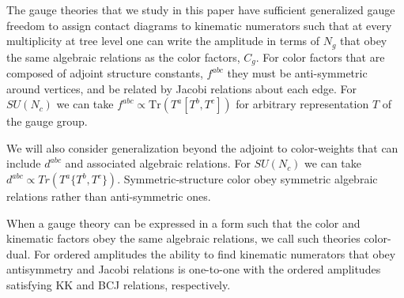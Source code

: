 \documentclass[11pt,letter]{article}
\newcommand{\threeTree}[3]{ {
\begin{tikzpicture}[baseline=7]
\begin{feynman}
\vertex (a1) at (-1.4,0){$i$} ;
\vertex (a2) at (-.4,1){#1} ;
\vertex (a3) at (.4,1){#2} ;
\vertex (a4) at (1.4,0){#3};
\vertex (mid1) at (-.4,0);
\vertex (mid2) at (.4, -0) ;
\diagram{
(mid1) --[ultra thick,](a1),
(mid1) --[ultra thick,](a2),
(mid1) --[ultra thick,](mid2),
(mid2) --[ultra thick,](a3),
(mid2) --[ultra thick,](a4),
};
\end{feynman}
\end{tikzpicture}
}
}
\begin{document}
The gauge theories that we study in this paper have sufficient generalized gauge freedom to assign contact diagrams to kinematic numerators such that at every multiplicity at tree level one can write the amplitude in terms of $N_g$ that obey the same algebraic relations as the color factors, $C_g$. For color factors that are composed of adjoint structure constants, $f^{abc}$ they must be anti-symmetric around vertices, and be related by Jacobi relations about each edge.   For $SU(N_c)$ we can take $f^{abc} \propto \text{Tr}(T^a[T^b,T^c])$ for arbitrary representation $T$ of the gauge group.
\iffalse
Explicitly, given the internal edge of a cubic graph, $\mathcal{G}{(ij|kl)}$, described functionally in terms of external edges,
\begin{equation}
\mathcal{G}{(ij|kl)}=\threeTree{$j$}{$k$}{$l$}
\end{equation}
we can construct color factors, $C(ij|kl)$, and kinematic factors, $N(ij|kl)$, that obey the following set of functional relations on all vertices of internal edges:
\begin{itemize}
\item \textbf{Antisymmetry Relations} $\Leftrightarrow$ \textbf{KK Relations}
\begin{equation}
C{(ij|kl)}+C{(ij|lk)} =0  \qquad \qquad N{(ij|kl)}+N{(ij|lk)} =0 
\end{equation}
\item \textbf{Jacobi Relations} $\Leftrightarrow$ \textbf{BCJ Relations}
\begin{equation}
C{(ij|kl)}+C{(il|jk)} +C{(ik|lj)} =0  \qquad N{(ij|kl)}+N{(il|jk)} +N{(ik|lj)} =0 
\end{equation}
\end{itemize}
\fi
We will also consider generalization beyond the adjoint to color-weights that can include $d^{abc}$ and associated algebraic relations.   For $SU(N_c)$ we can take $d^{abc} \propto Tr(T^a\{T^b,T^c\})$.  Symmetric-structure color obey symmetric algebraic relations rather than anti-symmetric ones.
\iffalse
\begin{equation}
C{(ij|kl)}-C{(ij|lk)} =0  \qquad \qquad N{(ij|kl)}-N{(ij|lk)} =0 
\end{equation}
Since the symmetric color factors, $C^{\text{dd}}_g$, and kinematic numerators, $\tilde{N}^{\text{dd}}_g$, obey the same algebraic relations, gauge theories that are color-dual in the symmetric-sense can similarly be double copied by making the replacement $C^{\text{dd}}_g\rightarrow \tilde{N}^{\text{dd}}_g$:
\begin{equation}
\mathcal{A} = \sum_{g}\frac{C^{\text{dd}}_gN^{\text{dd}}_g}{D_g} \quad \Rightarrow \quad \mathcal{M} = \sum_{g}\frac{\tilde{N}^{\text{dd}}_gN^{\text{dd}}_g}{D_g}
\end{equation}
\fi
When a gauge theory can be expressed in a form such that the color and kinematic factors obey the same algebraic relations, we call such theories {color-dual}.   For ordered amplitudes  the ability to find kinematic numerators that obey antisymmetry and Jacobi relations is one-to-one with the ordered amplitudes satisfying KK and BCJ relations, respectively.  
\end{document}
